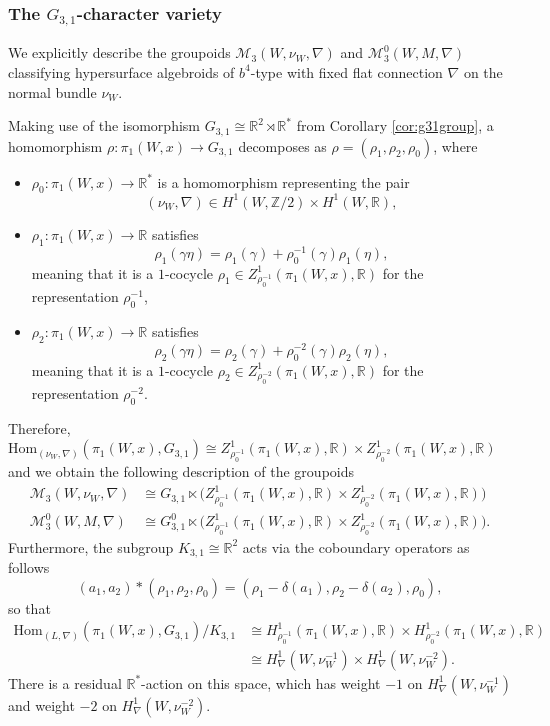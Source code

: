 \documentclass[10pt]{amsart}
\numberwithin{theoremalpha}{section}
\numberwithin{equation}{section}
\numberwithin{definition}{section}
\numberwithin{theorem}{section}
\numberwithin{proposition}{section}
\numberwithin{lemma}{section}
\numberwithin{example}{section}
\numberwithin{remark}{section}
\numberwithin{corollary}{section}
\numberwithin{question}{section}
\numberwithin{problem}{section}
\numberwithin{assumption}{section}
\theoremstyle{named}
\numberwithin{equation}{section}
\begin{document}
\subsubsection{The $G_{3,1}$-character variety}
We explicitly describe the groupoids $\mathcal{M}_{3}(W, \nu_W, \nabla)$ and $\mathcal{M}^0_{3}(W,M, \nabla)$ classifying hypersurface algebroids of $b^4$-type with fixed flat connection $\nabla$ on the normal bundle $\nu_W$. 

Making use of the isomorphism $G_{3,1} \cong \mathbb{R}^2 \rtimes \mathbb{R}^*$ from Corollary \ref{cor:g31group}, a homomorphism $\rho : \pi_{1}(W,x) \to G_{3,1}$ decomposes as $\rho = (\rho_1, \rho_2, \rho_0)$, where 
\begin{itemize}
\item $\rho_0 : \pi_{1}(W, x) \to \mathbb{R}^*$ is a homomorphism representing the pair 
\[
(\nu_W, \nabla) \in H^{1}(W, \mathbb{Z}/2) \times H^{1}(W, \mathbb{R}),
\] 
\item $\rho_{1} : \pi_{1}(W,x) \to \mathbb{R}$ satisfies 
\[
\rho_{1}(\gamma \eta) = \rho_{1}(\gamma) + \rho_{0}^{-1}(\gamma) \rho_{1}(\eta),
\]
meaning that it is a $1$-cocycle $\rho_{1} \in Z^{1}_{\rho_0^{-1}}(\pi_{1}(W,x), \mathbb{R})$ for the representation $\rho_0^{-1}$,
\item $\rho_{2} : \pi_{1}(W, x) \to \mathbb{R}$ satisfies 
\[
\rho_{2}(\gamma \eta) = \rho_{2}(\gamma) + \rho_{0}^{-2}(\gamma) \rho_{2}(\eta),
\]
meaning that it is a $1$-cocycle $\rho_{2} \in Z^{1}_{\rho_0^{-2}}(\pi_{1}(W,x), \mathbb{R})$ for the representation $\rho_{0}^{-2}$. 
\end{itemize} 
Therefore, $\mathrm{Hom}_{(\nu_W, \nabla)}(\pi_{1}(W,x), G_{3,1}) \cong Z^{1}_{\rho_0^{-1}}(\pi_{1}(W,x), \mathbb{R}) \times  Z^{1}_{\rho_0^{-2}}(\pi_{1}(W,x), \mathbb{R}) $ and we obtain the following description of the groupoids 
\begin{align*}
\mathcal{M}_{3}(W, \nu_W, \nabla) &\cong G_{3,1} \ltimes \big( Z^{1}_{\rho_0^{-1}}(\pi_{1}(W,x), \mathbb{R}) \times  Z^{1}_{\rho_0^{-2}}(\pi_{1}(W,x), \mathbb{R}) \big) \\
\mathcal{M}^0_{3}(W, M, \nabla) &\cong G^{0}_{3,1} \ltimes \big( Z^{1}_{\rho_0^{-1}}(\pi_{1}(W,x), \mathbb{R}) \times  Z^{1}_{\rho_0^{-2}}(\pi_{1}(W,x), \mathbb{R}) \big).
\end{align*}
Furthermore, the subgroup $K_{3,1} \cong \mathbb{R}^2$ acts via the coboundary operators as follows 
\[
(a_1, a_{2}) \ast (\rho_1, \rho_2, \rho_0) = (\rho_1 - \delta(a_1), \rho_2 - \delta(a_2), \rho_0),
\]
so that 
\begin{align*}
\mathrm{Hom}_{(L, \nabla)}(\pi_{1}(W,x), G_{3,1})/K_{3,1} &\cong H^{1}_{\rho_0^{-1}}(\pi_{1}(W,x), \mathbb{R}) \times  H^{1}_{\rho_0^{-2}}(\pi_{1}(W,x), \mathbb{R}) \\
 &\cong H^1_{\nabla}(W, \nu_W^{-1}) \times H^{1}_{\nabla}(W, \nu_W^{-2}). 
\end{align*}
There is a residual $\mathbb{R}^*$-action on this space, which has weight $-1$ on $H^1_{\nabla}(W, \nu_W^{-1})$ and weight $-2$ on $H^1_{\nabla}(W, \nu_W^{-2})$.
\end{document}
